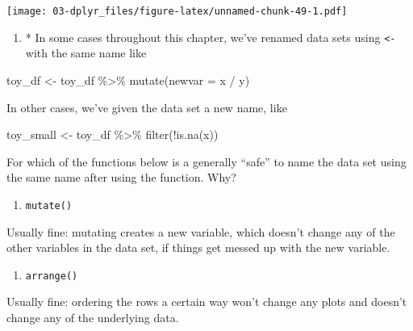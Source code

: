 \documentclass[
]{book}
\newenvironment{Shaded}{\begin{snugshade}}{\end{snugshade}}
\newcommand{\AttributeTok}[1]{\textcolor[rgb]{0.77,0.63,0.00}{#1}}
\newcommand{\FunctionTok}[1]{\textcolor[rgb]{0.00,0.00,0.00}{#1}}
\newcommand{\NormalTok}[1]{#1}
\newcommand{\OtherTok}[1]{\textcolor[rgb]{0.56,0.35,0.01}{#1}}
\newcommand{\SpecialCharTok}[1]{\textcolor[rgb]{0.00,0.00,0.00}{#1}}
\providecommand{\tightlist}{%
  \setlength{\itemsep}{0pt}\setlength{\parskip}{0pt}}
\begin{document}
\texttt{[image: 03-dplyr\_files/figure-latex/unnamed-chunk-49-1.pdf]}

\begin{enumerate}
\def\labelenumi{\arabic{enumi}.}
\setcounter{enumi}{3}
\tightlist
\item
  * In some cases throughout this chapter, we've renamed data sets using \texttt{\textless{}-} with the same name like
\end{enumerate}

\begin{Shaded}
\begin{Highlighting}[]
\NormalTok{toy\_df }\OtherTok{\textless{}{-}}\NormalTok{ toy\_df }\SpecialCharTok{\%\textgreater{}\%} \FunctionTok{mutate}\NormalTok{(}\AttributeTok{newvar =}\NormalTok{ x }\SpecialCharTok{/}\NormalTok{ y)}
\end{Highlighting}
\end{Shaded}

In other cases, we've given the data set a new name, like

\begin{Shaded}
\begin{Highlighting}[]
\NormalTok{toy\_small }\OtherTok{\textless{}{-}}\NormalTok{ toy\_df }\SpecialCharTok{\%\textgreater{}\%} \FunctionTok{filter}\NormalTok{(}\SpecialCharTok{!}\FunctionTok{is.na}\NormalTok{(x))}
\end{Highlighting}
\end{Shaded}

For which of the functions below is a generally ``safe'' to name the data set using the same name after using the function. Why?

\begin{enumerate}
\def\labelenumi{\alph{enumi}.}
\tightlist
\item
  \texttt{mutate()}
\end{enumerate}

Usually fine: mutating creates a new variable, which doesn't change any of the other variables in the data set, if things get messed up with the new variable.

\begin{enumerate}
\def\labelenumi{\alph{enumi}.}
\setcounter{enumi}{1}
\tightlist
\item
  \texttt{arrange()}
\end{enumerate}

Usually fine: ordering the rows a certain way won't change any plots and doesn't change any of the underlying data.
\end{document}
